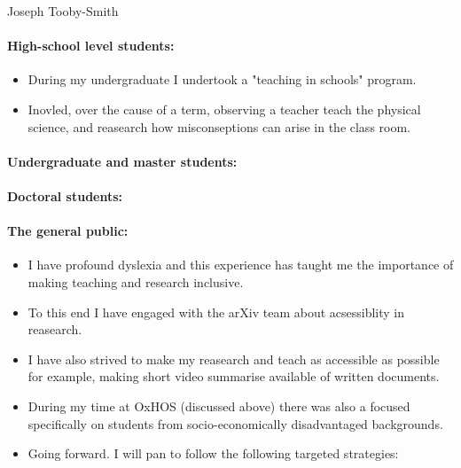 \documentclass[14pt,letter]{article}
\newcounter{customtitle}
\begin{document}
\vspace{-1cm}
\begin{flushright}
{{\Large \color{white}Joseph Tooby-Smith }}
\end{flushright}
\vspace{0.4cm}
\vspace{0.3cm}
\paragraph{High-school level students:} 
\begin{itemize}
\item During my undergraduate I undertook a "teaching in schools" program. 
\item Inovled, over the cause of a term, observing a teacher teach 
the physical science, and reasearch how misconseptions can arise in the 
class room.
\end{itemize}

\paragraph{Undergraduate and master students:} 

\paragraph{Doctoral students:} 

\paragraph{The general public:} 

\begin{itemize}
\item I have profound dyslexia and this experience has taught me the importance 
	of making teaching and research inclusive.
\item To this end I have engaged with the arXiv team about acsessiblity 
in reasearch. 
\item I have also strived to make my reasearch and teach as accessible as possible
for example, making short video summarise available of written documents. 
\item During my time at OxHOS (discussed above) there was also a focused 
specifically on students from socio-economically disadvantaged backgrounds. 
\item Going forward. I will pan to follow the following targeted strategies: 
\end{itemize} 
\end{document}
